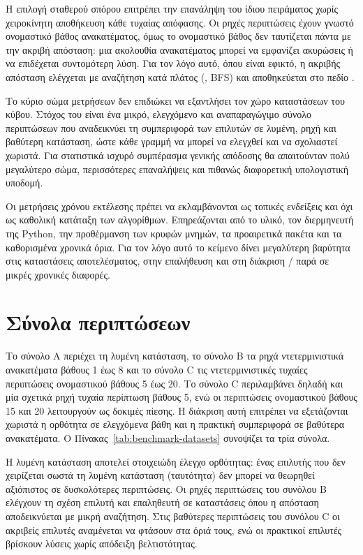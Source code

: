Η επιλογή σταθερού σπόρου επιτρέπει την επανάληψη του ίδιου πειράματος χωρίς χειροκίνητη αποθήκευση κάθε τυχαίας απόφασης. Οι ρηχές περιπτώσεις έχουν γνωστό ονομαστικό βάθος ανακατέματος, όμως το ονομαστικό βάθος δεν ταυτίζεται πάντα με την ακριβή απόσταση: μια ακολουθία ανακατέματος μπορεί να εμφανίζει ακυρώσεις ή να επιδέχεται συντομότερη λύση. Για τον λόγο αυτό, όπου είναι εφικτό, η ακριβής απόσταση ελέγχεται με αναζήτηση κατά πλάτος (, BFS) και αποθηκεύεται στο πεδίο .

Το κύριο σώμα μετρήσεων δεν επιδιώκει να εξαντλήσει τον χώρο καταστάσεων του κύβου. Στόχος του είναι ένα μικρό, ελεγχόμενο και αναπαραγώγιμο σύνολο περιπτώσεων που αναδεικνύει τη συμπεριφορά των επιλυτών σε λυμένη, ρηχή και βαθύτερη κατάσταση, ώστε κάθε γραμμή να μπορεί να ελεγχθεί και να σχολιαστεί χωριστά. Για στατιστικά ισχυρό συμπέρασμα γενικής απόδοσης θα απαιτούνταν πολύ μεγαλύτερο σώμα, περισσότερες επαναλήψεις και πιθανώς διαφορετική υπολογιστική υποδομή.

Οι μετρήσεις χρόνου εκτέλεσης πρέπει να εκλαμβάνονται ως τοπικές ενδείξεις και όχι ως καθολική κατάταξη των αλγορίθμων. Επηρεάζονται από το υλικό, τον διερμηνευτή της Python, την προθέρμανση των κρυφών μνημών, τα προαιρετικά πακέτα και τα καθορισμένα χρονικά όρια. Για τον λόγο αυτό το κείμενο δίνει μεγαλύτερη βαρύτητα στις καταστάσεις αποτελέσματος, στην επαλήθευση και στη διάκριση / παρά σε μικρές χρονικές διαφορές.

\section{Σύνολα περιπτώσεων}
\label{sec:experiments-cases}

Το σύνολο A περιέχει τη λυμένη κατάσταση, το σύνολο B τα ρηχά ντετερμινιστικά ανακατέματα βάθους 1 έως 8 και το σύνολο C τις ντετερμινιστικές τυχαίες περιπτώσεις ονομαστικού βάθους 5 έως 20. Το σύνολο C περιλαμβάνει δηλαδή και μία σχετικά ρηχή τυχαία περίπτωση βάθους 5, ενώ οι περιπτώσεις ονομαστικού βάθους 15 και 20 λειτουργούν ως δοκιμές πίεσης. Η διάκριση αυτή επιτρέπει να εξετάζονται χωριστά η ορθότητα σε ελεγχόμενα βάθη και η πρακτική συμπεριφορά σε βαθύτερα ανακατέματα. Ο Πίνακας~\ref{tab:benchmark-datasets} συνοψίζει τα τρία σύνολα.

Η λυμένη κατάσταση αποτελεί στοιχειώδη έλεγχο ορθότητας: ένας επιλυτής που δεν χειρίζεται σωστά τη λυμένη κατάσταση (ταυτότητα) δεν μπορεί να θεωρηθεί αξιόπιστος σε δυσκολότερες περιπτώσεις. Οι ρηχές περιπτώσεις του συνόλου B ελέγχουν τη σχέση επιλυτή και επαληθευτή σε καταστάσεις όπου η απόσταση αποδεικνύεται με μικρή αναζήτηση. Στις βαθύτερες περιπτώσεις του συνόλου C οι ακριβείς επιλυτές αναμένεται να φτάσουν στα όριά τους, ενώ οι πρακτικοί επιλυτές βρίσκουν λύσεις χωρίς απόδειξη βελτιστότητας.

